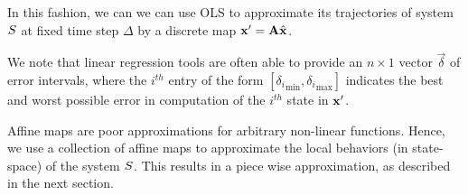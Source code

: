 In this fashion, we can we can use OLS to approximate its trajectories
of system $S$ at fixed time step $\Delta$ by a discrete map $\mathbf{x}'
= \mathbf{A}\hat{\mathbf{x}}$.


We note that linear regression tools are often able to provide an
$n\times 1$ vector $\vec{\delta}$ of error intervals, where the
$i^{th}$ entry of the form $[{\delta_i}_{\min},{\delta_i}_{\max}]$
indicates the best and worst possible error in computation of the
$i^{th}$ state in $\mathbf{x}'$.


Affine maps are poor approximations for arbitrary non-linear
functions. Hence, we use a collection of affine maps to approximate
the local behaviors (in state-space) of the system $S$. This
results in a piece wise approximation, as described in the next
section.





